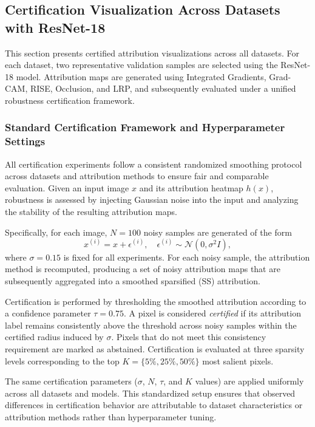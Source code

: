 \documentclass[11pt]{article}
\begin{document}
\subsection{Certification Visualization Across Datasets with ResNet-18}

This section presents certified attribution visualizations across all datasets. For each dataset, two representative validation samples are selected using the ResNet-18 model. Attribution maps are generated using Integrated Gradients, Grad-CAM, RISE, Occlusion, and LRP, and subsequently evaluated under a unified robustness certification framework.

\subsubsection{Standard Certification Framework and Hyperparameter Settings}

All certification experiments follow a consistent randomized smoothing protocol across datasets and attribution methods to ensure fair and comparable evaluation. Given an input image $x$ and its attribution heatmap $h(x)$, robustness is assessed by injecting Gaussian noise into the input and analyzing the stability of the resulting attribution maps.

Specifically, for each image, $N = 100$ noisy samples are generated of the form
\[
x^{(i)} = x + \epsilon^{(i)}, \quad \epsilon^{(i)} \sim \mathcal{N}(0, \sigma^2 I),
\]
where $\sigma = 0.15$ is fixed for all experiments. For each noisy sample, the attribution method is recomputed, producing a set of noisy attribution maps that are subsequently aggregated into a smoothed sparsified (SS) attribution.

Certification is performed by thresholding the smoothed attribution according to a confidence parameter $\tau = 0.75$. A pixel is considered \emph{certified} if its attribution label remains consistently above the threshold across noisy samples within the certified radius induced by $\sigma$. Pixels that do not meet this consistency requirement are marked as abstained. Certification is evaluated at three sparsity levels corresponding to the top $K=\{5\%, 25\%, 50\%\}$ most salient pixels.

The same certification parameters ($\sigma$, $N$, $\tau$, and $K$ values) are applied uniformly across all datasets and models. This standardized setup ensures that observed differences in certification behavior are attributable to dataset characteristics or attribution methods rather than hyperparameter tuning.
\end{document}
